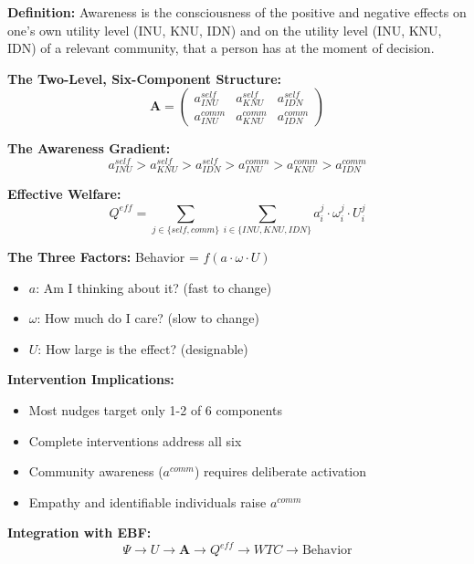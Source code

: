 \begin{tcolorbox}[colback=gray!5!white, colframe=gray!75!black, title=Chapter 11 Summary: Awareness]

\textbf{Definition:}
Awareness is the consciousness of the positive and negative effects on one's 
own utility level (INU, KNU, IDN) and on the utility level (INU, KNU, IDN) 
of a relevant community, that a person has at the moment of decision.

\textbf{The Two-Level, Six-Component Structure:}
$$\mathbf{A} = \begin{pmatrix}
a^{self}_{INU} & a^{self}_{KNU} & a^{self}_{IDN} \\
a^{comm}_{INU} & a^{comm}_{KNU} & a^{comm}_{IDN}
\end{pmatrix}$$

\textbf{The Awareness Gradient:}
$$a^{self}_{INU} > a^{self}_{KNU} > a^{self}_{IDN} > a^{comm}_{INU} > a^{comm}_{KNU} > a^{comm}_{IDN}$$

\textbf{Effective Welfare:}
$$Q^{eff} = \sum_{j \in \{self, comm\}} \sum_{i \in \{INU, KNU, IDN\}} a^j_i \cdot \omega^j_i \cdot U^j_i$$

\textbf{The Three Factors:}
Behavior = $f(a \cdot \omega \cdot U)$
\begin{itemize}
\item $a$: Am I thinking about it? (fast to change)
\item $\omega$: How much do I care? (slow to change)
\item $U$: How large is the effect? (designable)
\end{itemize}

\textbf{Intervention Implications:}
\begin{itemize}
\item Most nudges target only 1-2 of 6 components
\item Complete interventions address all six
\item Community awareness ($a^{comm}$) requires deliberate activation
\item Empathy and identifiable individuals raise $a^{comm}$
\end{itemize}

\textbf{Integration with EBF:}
$$\Psi \rightarrow U \rightarrow \mathbf{A} \rightarrow Q^{eff} \rightarrow WTC \rightarrow \text{Behavior}$$

\end{tcolorbox}

